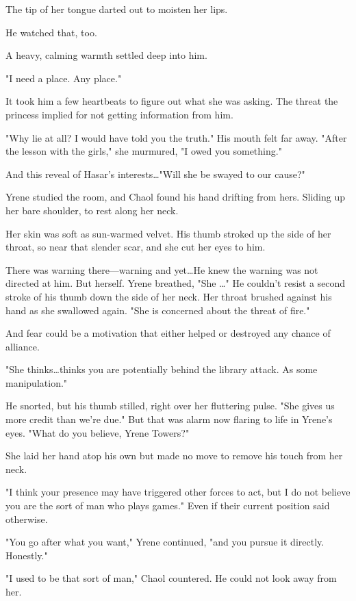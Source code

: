 The tip of her tongue darted out to moisten her lips.

He watched that, too.

A heavy, calming warmth settled deep into him.

"I need a place.
Any place."

It took him a few heartbeats to figure out what she was asking.
The threat the princess implied for not getting information from him.

"Why lie at all?
I would have told you the truth."
His mouth felt far away.
"After the lesson with the girls," she murmured, "I owed you something."

And this reveal of Hasar's interests\ldots "Will she be swayed to our cause?"

Yrene studied the room, and Chaol found his hand drifting from hers.
Sliding up her bare shoulder, to rest along her neck.

Her skin was soft as sun-warmed velvet.
His thumb stroked up the side of her throat, so near that slender scar, and she cut her eyes to him.

There was warning there---warning and yet\ldots He knew the warning was not directed at him.
But herself.
Yrene breathed, "She \ldots" He couldn't resist a second stroke of his thumb down the side of her neck.
Her throat brushed against his hand as she swallowed again.
"She is concerned about the threat of fire."

And fear could be a motivation that either helped or destroyed any chance of alliance.

"She thinks\ldots thinks you are potentially behind the library attack.
As some manipulation."

He snorted, but his thumb stilled, right over her fluttering pulse.
"She gives us more credit than we're due."
But that was alarm now flaring to life in Yrene's eyes.
"What do you believe, Yrene Towers?"

She laid her hand atop his own but made no move to remove his touch from her neck.

"I think your presence may have triggered other forces to act, but I do not believe you are the sort of man who plays games."
Even if their current position said otherwise.

"You go after what you want," Yrene continued, "and you pursue it directly.
Honestly."

"I used to be that sort of man," Chaol countered.
He could not look away from her.


